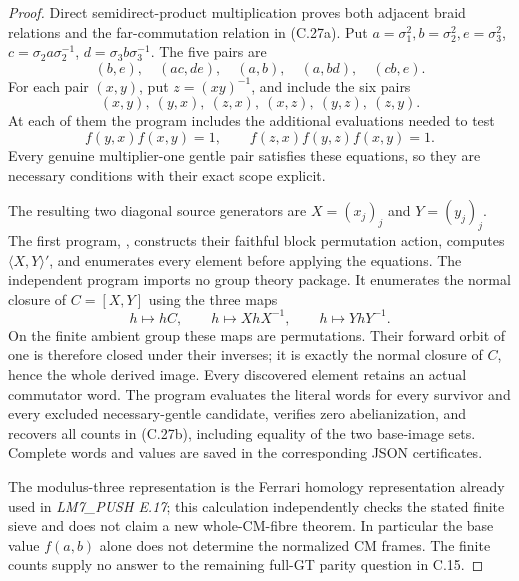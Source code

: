 \begin{proof}
Direct semidirect-product multiplication proves both
adjacent braid relations and the far-commutation relation
in (C.27a). Put
\(a=\sigma_1^2,b=\sigma_2^2,e=\sigma_3^2\),
\(c=\sigma_2a\sigma_2^{-1}\),
\(d=\sigma_3b\sigma_3^{-1}\).
The five pairs are
\[
 (b,e),\quad(ac,de),\quad(a,b),\quad(a,bd),\quad(cb,e).
\]
For each pair \((x,y)\), put \(z=(xy)^{-1}\),
and include the six pairs
\[
 (x,y),\ (y,x),\ (z,x),\ (x,z),\ (y,z),\ (z,y).
\]
At each of them the program includes the additional
evaluations needed to test
\[
 f(y,x)f(x,y)=1,
 \qquad f(z,x)f(y,z)f(x,y)=1.
\]
Every genuine multiplier-one gentle pair satisfies
these equations, so they are necessary conditions
with their exact scope explicit.

The resulting two diagonal source generators are
\(X=(x_j)_j\) and \(Y=(y_j)_j\).
The first program, ,
constructs their faithful block permutation action,
computes \(\langle X,Y\rangle'\), and enumerates
every element before applying the equations.
The independent program
 imports no group
theory package. It enumerates the normal closure of
\(C=[X,Y]\) using the three maps
\[
 h\longmapsto hC,\qquad
 h\longmapsto XhX^{-1},\qquad
 h\longmapsto YhY^{-1}.
\]
On the finite ambient group these maps are permutations.
Their forward orbit of one is therefore closed under
their inverses; it is exactly the normal closure of
\(C\), hence the whole derived image.
Every discovered element retains an actual commutator
word. The program evaluates the literal words for
every survivor and every excluded necessary-gentle
candidate, verifies zero abelianization, and recovers
all counts in (C.27b), including equality of the two
base-image sets. Complete words and values are saved
in the corresponding JSON certificates.

The modulus-three representation is the Ferrari
homology representation already used in
\emph{LM7\_PUSH E.17}; this calculation independently
checks the stated finite sieve and does not claim a new
whole-CM-fibre theorem. In particular the base value
\(f(a,b)\) alone does not determine the normalized
CM frames. The finite counts supply no answer to the
remaining full-GT parity question in C.15.
\end{proof}

